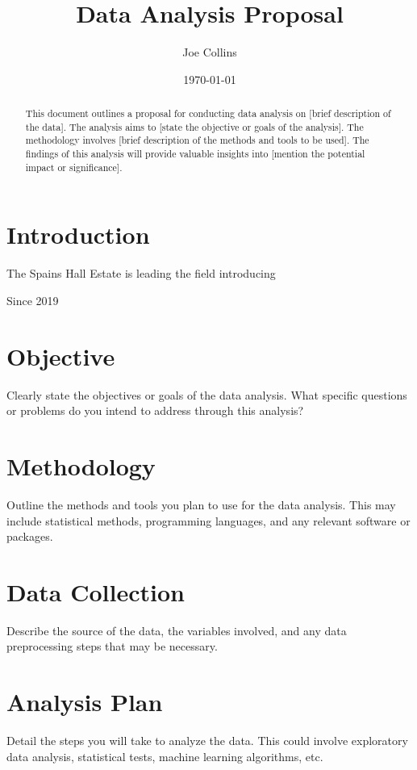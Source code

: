 \documentclass[a4paper,12pt]{article}
\title{Data Analysis Proposal}
\author{Joe Collins}
\date{\today}
\begin{document}
\maketitle

\begin{abstract}
    This document outlines a proposal for conducting data analysis on [brief description of the data]. The analysis aims to [state the objective or goals of the analysis]. The methodology involves [brief description of the methods and tools to be used]. The findings of this analysis will provide valuable insights into [mention the potential impact or significance].
\end{abstract}

\section{Introduction}

The Spains Hall Estate is leading the field introducing 

Since 2019




\section{Objective}
Clearly state the objectives or goals of the data analysis. What specific questions or problems do you intend to address through this analysis?

\section{Methodology}
Outline the methods and tools you plan to use for the data analysis. This may include statistical methods, programming languages, and any relevant software or packages.

\section{Data Collection}
Describe the source of the data, the variables involved, and any data preprocessing steps that may be necessary.

\section{Analysis Plan}
Detail the steps you will take to analyze the data. This could involve exploratory data analysis, statistical tests, machine learning algorithms, etc.
\end{document}
